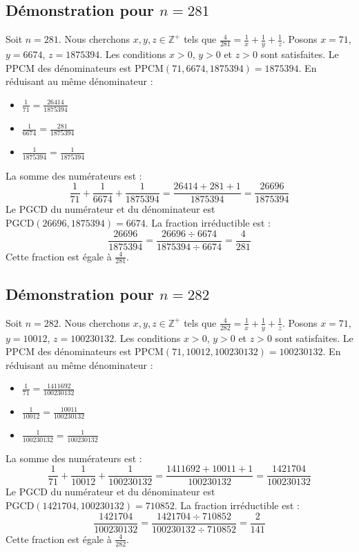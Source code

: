 \documentclass[11pt,a4paper]{article}
\begin{document}
\subsection{Démonstration pour $n = 281$}
Soit $n = 281$. Nous cherchons $x, y, z \in \mathbb{Z}^{+}$ tels que $\frac{4}{281} = \frac{1}{x} + \frac{1}{y} + \frac{1}{z}$.
Posons $x = 71$, $y = 6674$, $z = 1875394$.
Les conditions $x > 0$, $y > 0$ et $z > 0$ sont satisfaites.
Le PPCM des dénominateurs est $\text{PPCM}(71, 6674, 1875394) = 1875394$.
En réduisant au même dénominateur :
\begin{itemize}
    \item $\frac{1}{71} = \frac{26414}{1875394}$
    \item $\frac{1}{6674} = \frac{281}{1875394}$
    \item $\frac{1}{1875394} = \frac{1}{1875394}$
\end{itemize}
La somme des numérateurs est :
$$ \frac{1}{71} + \frac{1}{6674} + \frac{1}{1875394} = \frac{26414 + 281 + 1}{1875394} = \frac{26696}{1875394} $$
Le PGCD du numérateur et du dénominateur est $\text{PGCD}(26696, 1875394) = 6674$.
La fraction irréductible est :
$$ \frac{26696}{1875394} = \frac{26696 \div 6674}{1875394 \div 6674} = \frac{4}{281} $$
Cette fraction est égale à $\frac{4}{281}$.

\subsection{Démonstration pour $n = 282$}
Soit $n = 282$. Nous cherchons $x, y, z \in \mathbb{Z}^{+}$ tels que $\frac{4}{282} = \frac{1}{x} + \frac{1}{y} + \frac{1}{z}$.
Posons $x = 71$, $y = 10012$, $z = 100230132$.
Les conditions $x > 0$, $y > 0$ et $z > 0$ sont satisfaites.
Le PPCM des dénominateurs est $\text{PPCM}(71, 10012, 100230132) = 100230132$.
En réduisant au même dénominateur :
\begin{itemize}
    \item $\frac{1}{71} = \frac{1411692}{100230132}$
    \item $\frac{1}{10012} = \frac{10011}{100230132}$
    \item $\frac{1}{100230132} = \frac{1}{100230132}$
\end{itemize}
La somme des numérateurs est :
$$ \frac{1}{71} + \frac{1}{10012} + \frac{1}{100230132} = \frac{1411692 + 10011 + 1}{100230132} = \frac{1421704}{100230132} $$
Le PGCD du numérateur et du dénominateur est $\text{PGCD}(1421704, 100230132) = 710852$.
La fraction irréductible est :
$$ \frac{1421704}{100230132} = \frac{1421704 \div 710852}{100230132 \div 710852} = \frac{2}{141} $$
Cette fraction est égale à $\frac{4}{282}$.
\end{document}

